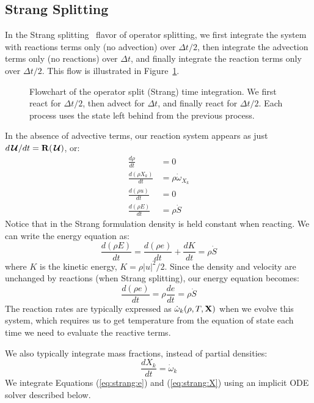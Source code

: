 \documentclass[linenumbers]{aastex631}
\newcommand{\omegadot}{\dot{\omega}}
\newcommand{\Sdot}{\dot{S}}
\newcommand{\odt}[1]{{\frac{{d#1}}{dt}}}
\newcommand{\Uc}{{\,\bm{\mathcal{U}}}}
\newcommand{\Rb}{{\bf R}}
\begin{document}
\subsection{Strang Splitting}

In the Strang splitting~\citep{strang:1968} flavor of operator splitting, we first integrate the system with reactions terms only (no advection)
over $\Delta t/2$, then integrate the advection terms only (no reactions) over $\Delta t$,
and finally integrate the reaction terms only over $\Delta t/2$.  This flow is illustrated
in Figure~\ref{fig:strang_flowchart}.

\begin{figure}[t]
  \caption{\label{fig:strang_flowchart} Flowchart of the operator split (Strang) time integration.  We first react for $\Delta t/2$, then
    advect for $\Delta t$, and finally react for $\Delta t/2$.  Each
    process uses the state left behind from the previous process.}
  \end{figure}


In the absence of advective terms, our reaction system appears as just
$d\Uc/dt = \Rb(\Uc)$, or:
\begin{align}
\odt{\rho} & = 0 \\
\odt{(\rho X_k)} &= \rho \dot\omega_{X_k} \\
\odt{(\rho u)} &= 0 \\
\odt{(\rho E)} &= \rho \Sdot
\end{align}
Notice that in the Strang formulation density is held constant when reacting.
We can write the energy equation as:
\begin{equation}
\odt{(\rho E)} = \odt{(\rho e)} + \odt{K} = \rho \Sdot
\end{equation}
where $K$ is the kinetic energy, $K = \rho |u|^2/2$.  Since the density and velocity
are unchanged by reactions (when Strang splitting), our energy equation becomes:
\begin{equation}
\label{eq:strang:e}
\odt{(\rho e)} = \rho \odt{e} = \rho \Sdot
\end{equation}
The reaction rates are typically expressed as $\omegadot_k(\rho, T, {\bf X})$
when we evolve this system, which requires us to get temperature from
the equation of state each
time we need to evaluate the reactive terms.

We also typically integrate mass fractions, instead of partial
densities:
\begin{equation}
\label{eq:strang:X}
\odt{X_k} = \omegadot_k
\end{equation}
We integrate Equations (\ref{eq:strang:e}) and (\ref{eq:strang:X})
using an implicit ODE solver described below.
\end{document}
